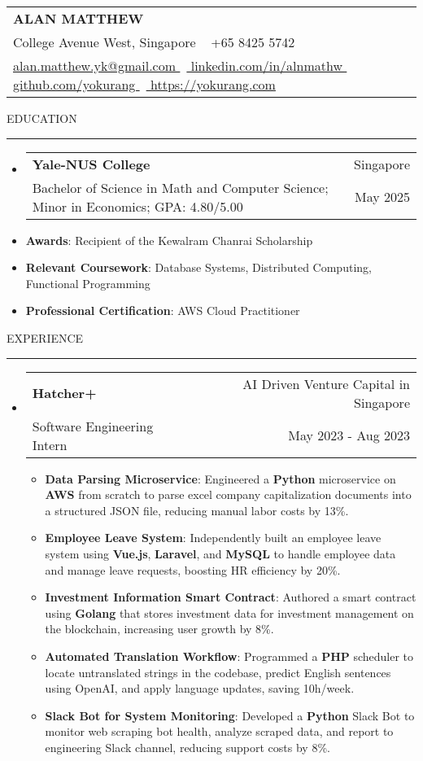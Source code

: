 \documentclass[letterpaper, 11pt]{article}
\makeatletter
\def\sectionlineskip{\medskip}
\def\sectionskip{\medskip}
\def\namesize{\LARGE}
\newcommand{\ResumeHeader}[6]{
  \noindent
  \begin{tabularx}{\textwidth}{>{\centering\arraybackslash}X}
    \namesize\MakeUppercase{\textbf{\fullname}} \\
    #1 \textbar\ #2 \\
    #3 \textbar\ #4 \textbar\ #5 \textbar\ #6 \\
  \end{tabularx}
}
\def \fullname { Alan Matthew }
\def \linkedinlink { https://www.linkedin.com/in/alnmathw }
\def \linkedintext { linkedin.com/in/alnmathw }
\def \phonenumber { +65 8425 5742 }
\def \githublink { https://github.com/yokurang }
\def \githubtext { github.com/yokurang }
\def \emaillink { mailto:alan.matthew.yk@gmail.com }
\def \emailtext { alan.matthew.yk@gmail.com }
\def \websitelink { https://yokurang.com }
\def \websitetext { https://yokurang.com }
\def \address { 28 College Avenue West, Singapore }
\def \headertype {\ResumeHeader}
\def \linkedin {\href{\linkedinlink}{\linkedintext}}
\def \phone {{\phonenumber}}
\def \email {\href{\emaillink}{\emailtext}}
\def \github {\href{\githublink}{\githubtext}}
\def \website {\href{\websitelink}{\websitetext}}
\newcommand{\SectionHeading}[1]{
  \sectionskip
  \raggedright\raggedbottom\MakeUppercase{\large{#1}}
  \sectionlineskip
  \hrule
  \color{black}
}
\newcommand{\ResumeEntryTSDL}[4]{
  \vspace{-1pt}\item
    \begin{tabular*}{\textwidth}[t]{l@{\extracolsep{\fill}}r} 
      \textbf{#1} & #2 \\
      #3 & #4 \\
    \end{tabular*}\vspace{-4pt}
}
\newcommand{\ResumeItem}[2]{
  \item{
    \textbf{#1}{: #2 \vspace{-2pt}}
  }
}
\newcommand{\ResumeSubItem}[2]{\ResumeItem{#1}{#2}\vspace{-4pt}}
\newcommand{\ResumeEntryStart}{\begin{itemize}[leftmargin=2mm, label={}]}
\newcommand{\ResumeEntryEnd}{\end{itemize}\vspace{-7pt}}
\newcommand{\ResumeItemListStart}{\begin{itemize}[leftmargin=5mm, label=$\bullet$]}
\newcommand{\ResumeItemListEnd}{\end{itemize}}
\makeatother
\begin{document}
  \headertype{\address}{\phone}{\email}{\linkedin}{\github}{\website}
  
  \SectionHeading{Education}
  \ResumeEntryStart
    \ResumeEntryTSDL{Yale-NUS College} {Singapore}
    {Bachelor of Science in Math and Computer Science; Minor in Economics; GPA: 4.80/5.00} {May 2025}
    \ResumeSubItem{Awards}{Recipient of the Kewalram Chanrai Scholarship}
    \ResumeSubItem{Relevant Coursework}{Database Systems, Distributed Computing, Functional Programming}
    \ResumeSubItem{Professional Certification}{AWS Cloud Practitioner}
  \ResumeEntryEnd

  \vspace{5pt}

  \SectionHeading{Experience}
  \ResumeEntryStart
    \ResumeEntryTSDL{Hatcher+}{AI Driven Venture Capital in Singapore}{Software Engineering Intern}{May 2023 - Aug 2023}
    \ResumeItemListStart
      \ResumeItem{Data Parsing Microservice}
      {Engineered a \textbf{Python} microservice on \textbf{AWS} from scratch to parse excel company capitalization documents into a structured JSON file, reducing manual labor costs by 13\%.}

      \ResumeItem{Employee Leave System}
      {Independently built an employee leave system using \textbf{Vue.js}, \textbf{Laravel}, and \textbf{MySQL} to handle employee data and manage leave requests, boosting HR efficiency by 20\%.}

      \ResumeItem{Investment Information Smart Contract}
      {Authored a smart contract using \textbf{Golang} that stores investment data for investment management on the blockchain, increasing user growth by 8\%.}

      \ResumeItem{Automated Translation Workflow}
      {Programmed a \textbf{PHP} scheduler to locate untranslated strings in the codebase, predict English sentences using OpenAI, and apply language updates, saving 10h/week.}

      \ResumeItem{Slack Bot for System Monitoring}
      {Developed a \textbf{Python} Slack Bot to monitor web scraping bot health, analyze scraped data, and report to engineering Slack channel, reducing support costs by 8\%.}
    \ResumeItemListEnd
  \ResumeEntryEnd
\end{document}
